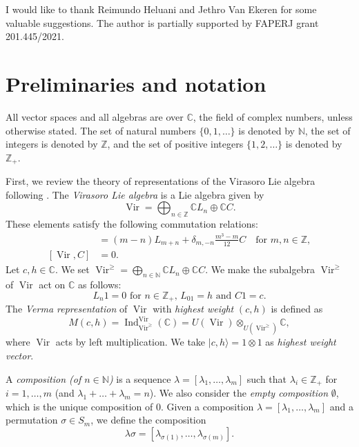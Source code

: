 \documentclass[a4paper, 12pt, reqno]{amsart}
\theoremstyle{remark}
\DeclareMathOperator{\Vir}{Vir}
\DeclareMathOperator{\Ind}{Ind}
\begin{document}
I would like to thank Reimundo Heluani and Jethro Van Ekeren for some valuable suggestions.
The author is partially supported by FAPERJ grant 201.445/2021.

\section{Preliminaries and notation}
\label{sec:prel-notat}

All vector spaces and all algebras are over $\mathbb{C}$, the field of complex numbers, unless otherwise stated.
The set of natural numbers $\{0, 1, \dots\}$ is denoted by $\mathbb{N}$, the set of integers is denoted by $\mathbb{Z}$, and the set of positive integers $\{1, 2, \dots\}$ is denoted by $\mathbb{Z}_+$.

First, we review the theory of representations of the Virasoro Lie algebra following \cite{kac_bombay_2013}.
The \emph{Virasoro Lie algebra} is a Lie algebra given by
\begin{equation*}
  \Vir = \bigoplus_{n \in \mathbb{Z}}\mathbb{C}L_n \oplus \mathbb{C}C.
\end{equation*}
These elements satisfy the following commutation relations:
\begin{align*}
  [L_m, L_n] &= (m - n)L_{m + n} + \delta_{m, -n}\frac{m^3 - m}{12}C \quad \text{for $m, n \in \mathbb{Z}$}, \\
  [\Vir, C] &= 0.
\end{align*}
Let $c, h \in \mathbb{C}$.
We set $\Vir^{\ge} = \bigoplus_{n \in \mathbb{N}}\mathbb{C}L_n \oplus \mathbb{C}C$.
We make the subalgebra $\Vir^{\ge}$ of $\Vir$ act on $\mathbb{C}$ as follows:
\begin{equation*}
  \text{$L_n1 = 0$ for $n \in \mathbb{Z}_+$, $L_01 = h$ and $C1 = c$}.
\end{equation*}
The \emph{Verma representation} of $\Vir$ with \emph{highest weight} $(c, h)$ is defined as
\begin{equation*}
  M(c, h) = \Ind^{\Vir}_{\Vir^{\ge}}(\mathbb{C}) = U(\Vir) \otimes_{U(\Vir^{\ge})} \mathbb{C},
\end{equation*}
where $\Vir$ acts by left multiplication.
We take $|c, h\rangle = 1\otimes1$ as \emph{highest weight vector}.

A \emph{composition (of $n \in \mathbb{N}$)} is a sequence $\lambda = [\lambda_1, \dots, \lambda_m]$ such that $\lambda_i \in \mathbb{Z}_+$ for $i = 1, \dots, m$ (and $\lambda_1 + \dots + \lambda_m = n$).
We also consider the \emph{empty composition} $\emptyset$, which is the unique composition of $0$.
Given a composition $\lambda = [\lambda_1, \dots, \lambda_m]$ and a permutation $\sigma \in S_m$, we define the composition
\begin{equation*}
  \lambda\sigma = [\lambda_{\sigma(1)}, \dots, \lambda_{\sigma(m)}].
\end{equation*}
\end{document}
